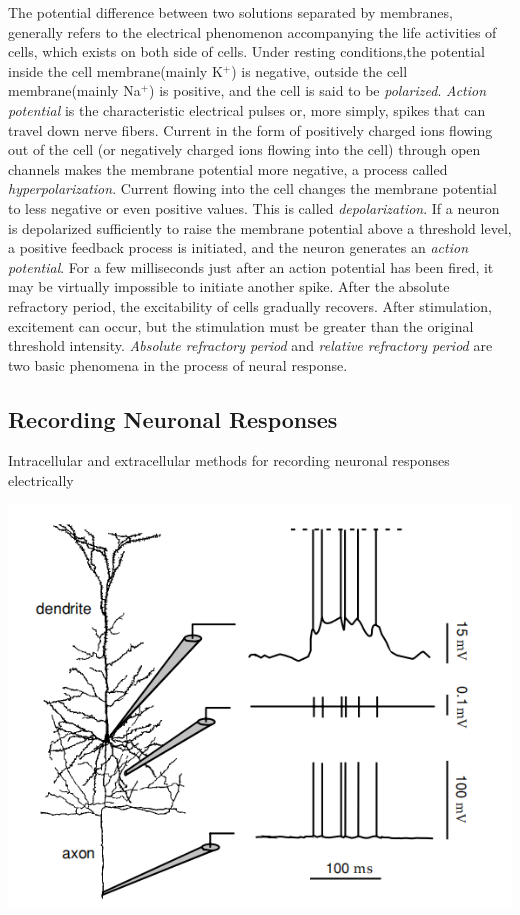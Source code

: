 The potential difference between two solutions separated by membranes, generally refers to the electrical phenomenon accompanying the life activities of cells, which exists on both side of cells.
\rem Under resting conditions,the potential inside the cell membrane(mainly K$^+$) is negative, outside the cell membrane(mainly Na$^+$) is positive, and the cell is said to be \emph{polarized}.
 \emph{Action potential} is the characteristic electrical pulses or, more simply, spikes that can travel down nerve fibers.
\con [Hyperpolarization]Current in the form of positively charged ions flowing out of the cell (or negatively charged ions flowing into the cell) through open channels makes the membrane potential more negative, a process called \emph{hyperpolarization}.
\con [Depolarization]Current flowing into the cell changes the membrane potential to less negative or even positive values. This is called \emph{depolarization}.
\rem If a neuron is depolarized sufficiently to raise the membrane potential above a threshold level, a positive feedback process is initiated, and the neuron generates an \emph{action potential}.
For a few milliseconds just after an action potential has been fired, it may be virtually impossible to initiate another spike.
After the absolute refractory period, the excitability of cells gradually recovers. After stimulation, excitement can occur, but the stimulation must be greater than the original threshold intensity.
\rem \emph{Absolute refractory period} and \emph{relative refractory period} are two basic phenomena in the process of neural response.
\subsection{Recording Neuronal Responses}
\exm Intracellular and extracellular methods for recording neuronal responses electrically
\begin{center}
    \label{fig:1.3}
    \includegraphics[scale = 0.35]{png/Figure1-3}\\
\end{center}

